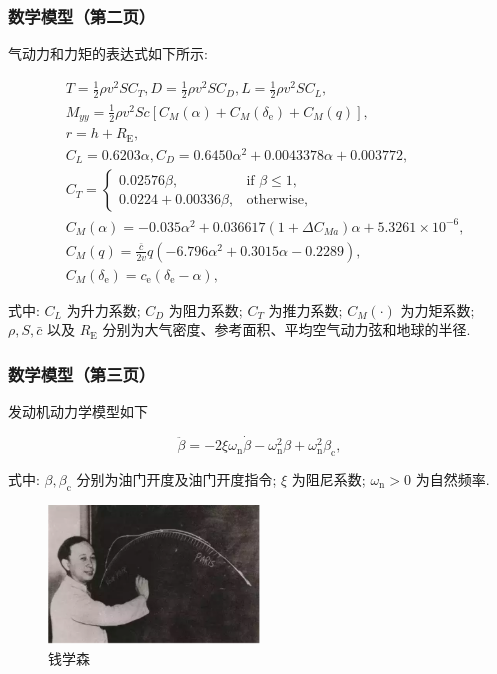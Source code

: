 \documentclass[
10pt,
aspectratio=43,
]{beamer}
\begin{document}
\begin{frame}
	\frametitle{数学模型（第二页）}

	气动力和力矩的表达式如下所示:

	\[
		\begin{aligned}
			 & T=\frac{1}{2} \rho v^2 S C_T, D=\frac{1}{2} \rho v^2 S C_D, L=\frac{1}{2} \rho v^2 S C_L,            \\
			 & M_{y y}=\frac{1}{2} \rho v^2 S c\left[C_M(\alpha)+C_M\left(\delta_{\mathrm{e}}\right)+C_M(q)\right], \\
			 & r=h+R_{\mathrm{E}},                                                                                  \\
			 & C_L=0.6203 \alpha, C_D=0.6450 \alpha^2+0.0043378 \alpha+0.003772,                                    \\
			 & C_T=\begin{cases}
				       0.02576 \beta,        & \text{if } \beta \leq 1, \\
				       0.0224+0.00336 \beta, & \text{otherwise},
			       \end{cases}                                                 \\
			 & C_M(\alpha)=-0.035 \alpha^2+0.036617(1+\Delta C_{M a}) \alpha+5.3261 \times 10^{-6},                 \\
			 & C_M(q)=\frac{\bar{c}}{2 v} q(-6.796 \alpha^2+0.3015 \alpha-0.2289),                                  \\
			 & C_M(\delta_{\mathrm{e}})=c_{\mathrm{e}}(\delta_{\mathrm{e}}-\alpha),
		\end{aligned}
	\]

	式中: $C_L$ 为升力系数; $C_D$ 为阻力系数; $C_T$ 为推力系数; $C_M(\cdot)$ 为力矩系数; $\rho, S, \bar{c}$ 以及 $R_{\mathrm{E}}$ 分别为大气密度、参考面积、平均空气动力弦和地球的半径.
\end{frame}
\begin{frame}
	\frametitle{数学模型（第三页）}

	发动机动力学模型如下

	\[
		\ddot{\beta}=-2 \xi \omega_{\mathrm{n}} \dot{\beta}-\omega_{\mathrm{n}}^2 \beta+\omega_{\mathrm{n}}^2 \beta_{\mathrm{c}},
	\]

	式中: $\beta, \beta_{\mathrm{c}}$ 分别为油门开度及油门开度指令; $\xi$ 为阻尼系数; $\omega_{\mathrm{n}}>0$ 为自然频率.
	
	\begin{figure}
		\centering
		\includegraphics[width=0.5\textwidth]{qianxuesen.png}
		\caption{钱学森}
	\end{figure}

\end{frame}
\end{document}
